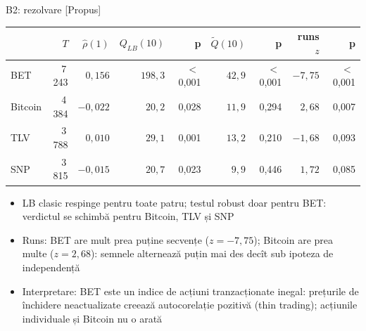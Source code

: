 \ifsolutions
\begin{frame}{B2: rezolvare [Propus]}
\itemsize{\footnotesize}
\begin{center}
\footnotesize
\begin{tabular}{lrrrrrrrr}
\toprule
& $T$ & $\hat\rho(1)$ & $Q_{LB}(10)$ & p & $\tilde Q(10)$ & p & runs $z$ & p \\
\midrule
BET & 7\,243 & ${0{,}156}$ & $198{,}3$ & $<$\,0{,}001 & $42{,}9$ & $<$\,0{,}001 & ${-7{,}75}$ & $<$\,0{,}001 \\
Bitcoin & 4\,384 & ${-0{,}022}$ & $20{,}2$ & 0{,}028 & $11{,}9$ & 0{,}294 & ${2{,}68}$ & 0{,}007 \\
TLV & 3\,788 & ${0{,}010}$ & $29{,}1$ & 0{,}001 & $13{,}2$ & 0{,}210 & ${-1{,}68}$ & 0{,}093 \\
SNP & 3\,815 & ${-0{,}015}$ & $20{,}7$ & 0{,}023 & $9{,}9$ & 0{,}446 & ${1{,}72}$ & 0{,}085 \\
\bottomrule
\end{tabular}
\end{center}
\begin{itemize}
    \item LB clasic respinge pentru toate patru; testul robust doar pentru BET: verdictul se schimbă pentru Bitcoin, TLV și SNP
    \item Runs: BET are mult prea puține secvențe ($z = -7{,}75$); Bitcoin are prea multe ($z = 2{,}68$): semnele alternează puțin mai des decît sub ipoteza de independență
    \item Interpretare: BET este un indice de acțiuni tranzacționate inegal: prețurile de închidere neactualizate creează autocorelație pozitivă (thin trading); acțiunile individuale și Bitcoin nu o arată
\end{itemize}
\end{frame}
\fi

